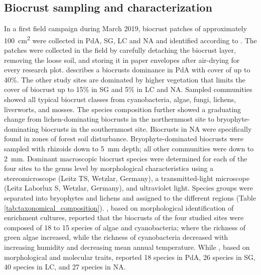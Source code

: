 \subsection{Biocrust sampling and characterization}

In a first field campaign during March 2019, biocrust patches of approximately \SI{100}{\centi\metre^{2}} were collected in PdA, SG, LC and NA and identified according to \citet{Lange2016}. The patches were collected in the field by carefully detaching the biocrust layer, removing the loose soil, and storing it in paper envelopes after air-drying for every research plot. \citet{Samolov2020} describes a biocrusts dominance in PdA with cover of up to 40\%. The other study sites are dominated by higher vegetation that limits the cover of biocrust up to 15\% in SG and 5\% in LC and NA. Sampled communities showed all typical biocrust classes from cyanobacteria, algae, fungi, lichens, liverworts, and mosses. The species composition further showed a graduating change from lichen-dominating biocrusts in the northernmost site to bryophyte-dominating biocrusts in the southernmost site. Biocrusts in NA were specifically found in zones of forest soil disturbance. Bryophyte-dominated biocrusts were sampled with rhizoids down to \SI{5}{\milli\metre} depth; all other communities were down to \SI{2}{\milli\metre}. Dominant macroscopic biocrust species were determined for each of the four sites to the genus level by morphological characteristics using a stereomicroscope (Leitz TS, Wetzlar, Germany), a transmitted-light microscope (Leitz Laborlux S, Wetzlar, Germany), and ultraviolet light. Species groups were separated into bryophytes \citep{Ardiles2014,BednarekOchyra2001,Cuvertino2012,He1998,Lightowlers2013} and lichens \citep{Galloway2007} and assigned to the different regions (Table \ref{tab:taxonomical_composition}). \citet{Bernhard2018}, based on morphological identification of enrichment cultures, reported that the biocrusts of the four studied sites were composed of 18 to 15 species of algae and cyanobacteria; where the richness of green algae increased, while the richness of cyanobacteria decreased with increasing humidity and decreasing mean annual temperature. While \citet{Samolov2020}, based on morphological and molecular traits, reported 18 species in PdA, 26 species in SG, 40 species in LC, and 27 species in NA.


